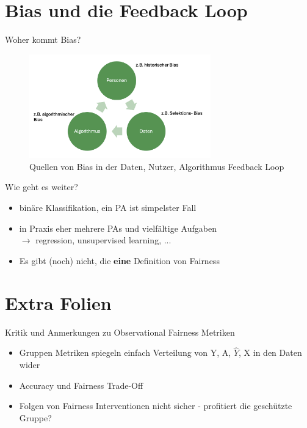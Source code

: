 \documentclass[aspectratio=169]{beamer}
\begin{document}
\section{Bias und die Feedback Loop}
\begin{frame}{Woher kommt Bias?}
	\begin{figure}
		\centering
		\includegraphics[width=0.7\textwidth]{../figures/bias_loop.png}
		\caption{Quellen von Bias in der Daten, Nutzer, Algorithmus Feedback Loop} %
	\end{figure}
\end{frame}

\begin{frame}{Wie geht es weiter?}
	\begin{itemize}
		\item<1-> binäre Klassifikation, ein PA ist simpelster Fall
		\item<2-> in Praxis eher mehrere PAs und vielfältige Aufgaben\\ $\rightarrow$ regression, unsupervised learning, ...
		\item<3-> Es gibt (noch) nicht, die \textbf{eine} Definition von Fairness
	\end{itemize}
\end{frame}

% 	
% 	

\section{Extra Folien}

\begin{frame}{Kritik und Anmerkungen zu Observational Fairness Metriken}
	\begin{itemize}
		\item Gruppen Metriken spiegeln einfach Verteilung von Y, A, $\hat{Y}$, X in den Daten wider
		\item Accuracy und Fairness Trade-Off
		\item Folgen von Fairness Interventionen nicht sicher - profitiert die geschützte Gruppe?
	\end{itemize}
\end{frame}
\end{document}
